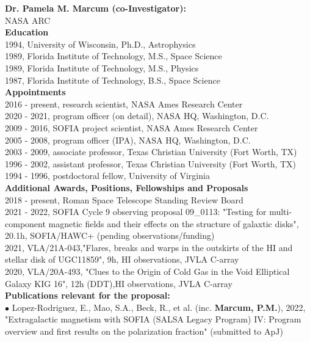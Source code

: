 \textbf{\color{Blue}\large Dr. Pamela M. Marcum (co-Investigator):}\\
NASA ARC\\
\medskip
\textbf{Education}\\
1994, University of Wisconsin, Ph.D., Astrophysics\\
1989, Florida Institute of Technology, M.S., Space Science\\
1989, Florida Institute of Technology, M.S., Physics\\
1987, Florida Institute of Technology, B.S., Space Science\\
\vspace{2ex}
\textbf{Appointments}\\
2016 - present, research scientist, NASA Ames Research Center\\
2020 - 2021, program officer (on detail), NASA HQ, Washington, D.C.\\
2009 - 2016, SOFIA project scientist, NASA Ames Research Center\\
2005 - 2008, program officer (IPA), NASA HQ, Washington, D.C.\\
2003 - 2009, associate professor, Texas Christian University (Fort Worth, TX)\\
1996 - 2002, assistant professor, Texas Christian University (Fort Worth, TX)\\
1994 - 1996, postdoctoral fellow, University of Virginia\\
\vspace{2ex}
\textbf{Additional Awards, Positions, Fellowships and Proposals}\\
2018 - present, Roman Space Telescope Standing Review Board\\
2021 - 2022, SOFIA Cycle 9 observing proposal 09\_0113: "Testing for multi-component magnetic fields and their effects on the structure of galaxtic disks", 20.1h, SOFIA/HAWC+ (pending observations/funding)\\
2021, VLA/21A-043,"Flares, breaks and warps in the outskirts of the HI and stellar disk of UGC11859", 9h, HI observations, JVLA C-array\\
2020, VLA/20A-493, "Clues to the Origin of Cold Gas in the Void Elliptical Galaxy KIG 16", 12h (DDT),HI observations, JVLA C-array\\
\vspace{2ex}
\textbf{Publications relevant for the proposal:}\\
{\scriptsize{$\bullet$}} Lopez-Rodriguez, E., Mao, S.A., Beck, R., et al. (inc. \textbf{Marcum, P.M.}), 2022, "Extragalactic magnetism with SOFIA (SALSA Legacy Program) IV: Program overview and first results on the polarization fraction" (submitted to ApJ)\\
